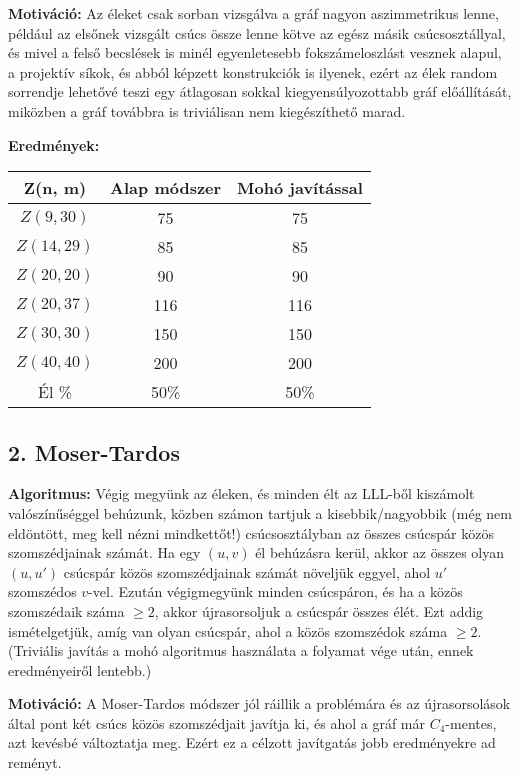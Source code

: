 \documentclass[12pt,a4paper]{article}
\begin{document}
\textbf{Motiváció:} Az éleket csak sorban vizsgálva a gráf nagyon aszimmetrikus lenne, például az elsőnek vizsgált csúcs össze lenne kötve az egész másik csúcsosztállyal, és mivel a felső becslések is minél egyenletesebb fokszámeloszlást vesznek alapul, a projektív síkok, és abból képzett konstrukciók is ilyenek, ezért az élek random sorrendje lehetővé teszi egy átlagosan sokkal kiegyensúlyozottabb gráf előállítását, miközben a gráf továbbra is triviálisan nem kiegészíthető marad.

\textbf{Eredmények:}
\begin{table}[H]
\centering
\begin{tabular}{|c|c|c|}
\hline
\textbf{Z(n, m)} & \textbf{Alap módszer} & \textbf{Mohó javítással} \\
\hline
$Z(9,30)$  & 75 & 75 \\
$Z(14, 29)$ & 85 & 85 \\
$Z(20, 20)$ & 90 & 90 \\
$Z(20, 37)$ & 116 & 116 \\
$Z(30, 30)$ & 150 & 150 \\
$Z(40, 40)$ & 200 & 200 \\
\hline
Él \% & 50\% & 50\% \\
\hline
\end{tabular}
\end{table}

\subsection*{2. Moser-Tardos}

\textbf{Algoritmus:} Végig megyünk az éleken, és minden élt az LLL-ből kiszámolt valószínűséggel behúzunk, közben számon tartjuk a kisebbik/nagyobbik (még nem eldöntött, meg kell nézni mindkettőt!) csúcsosztályban az összes csúcspár közös szomszédjainak számát. Ha egy $(u,v)$ él behúzásra kerül, akkor az összes olyan $(u,u')$ csúcspár közös szomszédjainak számát növeljük eggyel, ahol $u'$ szomszédos $v$-vel. Ezután végigmegyünk minden csúcspáron, és ha a közös szomszédaik száma $\geq 2$, akkor újrasorsoljuk a csúcspár összes élét. Ezt addig ismételgetjük, amíg van olyan csúcspár, ahol a közös szomszédok száma $\geq 2$. (Triviális javítás a mohó algoritmus használata a folyamat vége után, ennek eredményeiről lentebb.)

\textbf{Motiváció:} A Moser-Tardos módszer jól ráillik a problémára és az újrasorsolások által pont két csúcs közös szomszédjait javítja ki, és ahol a gráf már $C_4$-mentes, azt kevésbé változtatja meg. Ezért ez a célzott javítgatás jobb eredményekre ad reményt.
\end{document}
